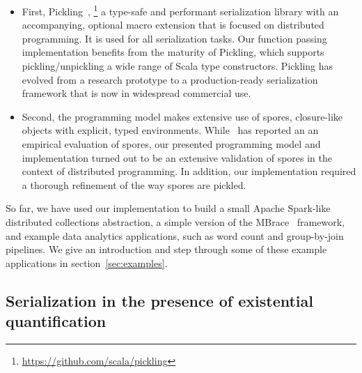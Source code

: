 \documentclass{jfp1}
\begin{document}
\begin{itemize}

  \item First, Pickling~\cite{Pickling},
    \footnote{\url{https://github.com/scala/pickling}} a type-safe and
    performant serialization library with an accompanying, optional macro
    extension that is focused on distributed programming. It is used for all
    serialization tasks. Our function passing implementation benefits from the
    maturity of Pickling, which supports pickling/unpickling a wide range of
    Scala type constructors. Pickling has evolved from a research prototype to a
    production-ready serialization framework that is now in widespread
    commercial use.

  \item Second, the programming model makes extensive use of spores,
    closure-like objects with explicit, typed environments. While~\cite{Spores}
    has reported an an empirical evaluation of spores, our presented programming
    model and implementation turned out to be an extensive validation of spores
    in the context of distributed programming. In addition, our implementation
    required a thorough refinement of the way spores are pickled.

\end{itemize}

So far, we have used our implementation to build a small Apache Spark-like
distributed collections abstraction, a simple version of the
MBrace~\cite{MBrace} framework, and example data analytics applications, such as
word count and group-by-join pipelines. We give an introduction and step through
some of these example applications in section~\ref{sec:examples}.



\subsection{Serialization in the presence of existential quantification}
\end{document}
